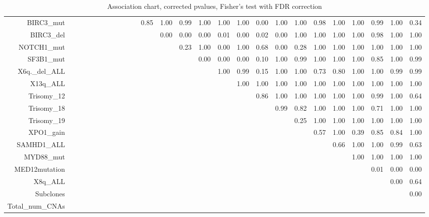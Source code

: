 \documentclass[a4paper,11pt]{article}
\begin{document}
\begin{landscape}
\begin{table}[ht]
{{\begin{tabular}{|r|c|c|c|c|c|c|c|c|c|c|c|c|c|c|c|c|c|c|c|c|c|c|c|c|c|}
  BIRC3\_mut &  &  &  &  &  &  &  &  &  &  & 0.85 & 1.00 & 0.99 & 1.00 & 1.00 & 1.00 & 0.00 & 1.00 & 1.00 & 0.98 & 1.00 & 1.00 & 0.99 & 1.00 & 0.34 \\ 
  BIRC3\_del &  &  &  &  &  &  &  &  &  &  &  & 0.00 & 0.00 & 0.00 & 0.01 & 0.00 & 0.02 & 0.00 & 1.00 & 1.00 & 1.00 & 1.00 & 0.98 & 1.00 & 1.00 \\ 
  NOTCH1\_mut &  &  &  &  &  &  &  &  &  &  &  &  & 0.23 & 1.00 & 0.00 & 1.00 & 0.68 & 0.00 & 0.28 & 1.00 & 1.00 & 1.00 & 1.00 & 1.00 & 1.00 \\ 
  SF3B1\_mut &  &  &  &  &  &  &  &  &  &  &  &  &  & 0.00 & 0.00 & 0.00 & 0.10 & 1.00 & 0.99 & 1.00 & 1.00 & 1.00 & 0.85 & 1.00 & 0.99 \\ 
  X6q.\_del\_ALL &  &  &  &  &  &  &  &  &  &  &  &  &  &  & 1.00 & 0.99 & 0.15 & 1.00 & 1.00 & 0.73 & 0.80 & 1.00 & 1.00 & 0.99 & 0.99 \\ 
  X13q\_ALL &  &  &  &  &  &  &  &  &  &  &  &  &  &  &  & 1.00 & 1.00 & 1.00 & 1.00 & 1.00 & 1.00 & 1.00 & 1.00 & 1.00 & 1.00 \\ 
  Trisomy\_12 &  &  &  &  &  &  &  &  &  &  &  &  &  &  &  &  & 0.86 & 1.00 & 1.00 & 1.00 & 1.00 & 1.00 & 0.99 & 1.00 & 0.64 \\ 
  Trisomy\_18 &  &  &  &  &  &  &  &  &  &  &  &  &  &  &  &  &  & 0.99 & 0.82 & 1.00 & 1.00 & 1.00 & 0.71 & 1.00 & 1.00 \\ 
  Trisomy\_19 &  &  &  &  &  &  &  &  &  &  &  &  &  &  &  &  &  &  & 0.25 & 1.00 & 1.00 & 1.00 & 1.00 & 1.00 & 1.00 \\ 
  XPO1\_gain &  &  &  &  &  &  &  &  &  &  &  &  &  &  &  &  &  &  &  & 0.57 & 1.00 & 0.39 & 0.85 & 0.84 & 1.00 \\ 
  SAMHD1\_ALL &  &  &  &  &  &  &  &  &  &  &  &  &  &  &  &  &  &  &  &  & 0.66 & 1.00 & 1.00 & 0.99 & 0.63 \\ 
  MYD88\_mut &  &  &  &  &  &  &  &  &  &  &  &  &  &  &  &  &  &  &  &  &  & 1.00 & 1.00 & 1.00 & 1.00 \\ 
  MED12mutation &  &  &  &  &  &  &  &  &  &  &  &  &  &  &  &  &  &  &  &  &  &  & 0.01 & 0.00 & 0.00 \\ 
  X8q\_ALL &  &  &  &  &  &  &  &  &  &  &  &  &  &  &  &  &  &  &  &  &  &  &  & 0.00 & 0.64 \\ 
  Subclones &  &  &  &  &  &  &  &  &  &  &  &  &  &  &  &  &  &  &  &  &  &  &  &  & 0.00 \\ 
  Total\_num\_CNAs &  &  &  &  &  &  &  &  &  &  &  &  &  &  &  &  &  &  &  &  &  &  &  &  &  \\ 
   \hline
\end{tabular}
}
}
\caption{Association chart, corrected pvalues, Fisher's test with FDR correction} 
\end{table} \end{landscape}
\end{document}
